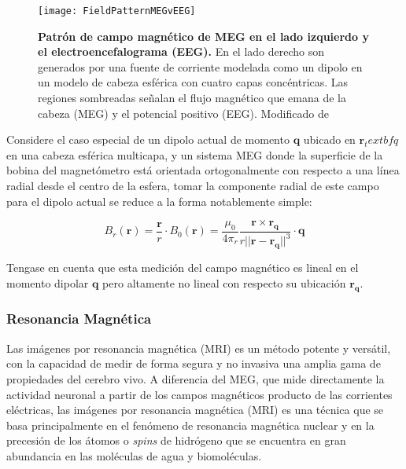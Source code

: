 \documentclass[11pt,letterpaper]{article}
\numberwithin{equation}{subsection}
\numberwithin{table}{subsection}
\begin{document}
\begin{figure}[H]
\centering
	\texttt{[image: FieldPatternMEGvEEG]}
	\captionsetup{labelfont=bf}
	\caption{\scriptsize \textbf{Patrón de campo magnético de MEG en el lado izquierdo y el electroencefalograma (EEG).} En el lado derecho son generados por una fuente de corriente modelada como un dipolo en un modelo de cabeza esférica con cuatro capas concéntricas. Las regiones sombreadas señalan el flujo magnético que emana de la cabeza (MEG) y el potencial positivo (EEG). Modificado de \cite{niedermeyer2005electroencephalography}} 
	\label{fig:Fig4}
\end{figure}

\bigskip
\noindent  Considere el caso especial de un dipolo actual de momento $\textbf{q}$ ubicado en $\textbf{r}_textbf{q}$ en una cabeza esférica multicapa, y un sistema MEG donde la superficie de la bobina del magnetómetro está orientada ortogonalmente con respecto a una línea radial desde el centro de la esfera, tomar la componente radial de este campo para el dipolo actual se reduce a la forma notablemente simple: 

\begin{equation}
B_r(\textbf{r}) = \frac{\textbf{r}}{r}\cdot B_0(\textbf{r})=\frac{\mu_0}{4\pi_r} \frac{\textbf{r} \times \textbf{r}_\textbf{q}}{r||\textbf{r} - \textbf{r}_\textbf{q}||^3} \cdot \textbf{q} 
\end{equation}

\smallskip
\noindent Tengase en cuenta que esta medición del campo magnético es lineal en el momento dipolar $\textbf{q}$ pero altamente no lineal con respecto su ubicación $\textbf{r}_\textbf{q}$. 

\bigskip
\noindent 

\subsubsection{Resonancia Magnética}

\smallskip
\noindent Las imágenes por resonancia magnética (MRI) es un método potente y versátil, con la capacidad de medir de forma segura y no invasiva una amplia gama de propiedades del cerebro vivo. A diferencia del MEG, que mide directamente la actividad neuronal a partir de los campos magnéticos producto de las corrientes eléctricas, las imágenes por resonancia magnética (MRI) es una técnica que se basa principalmente en el fenómeno de resonancia magnética nuclear y en la precesión  de los  átomos  o \textit{spins} de hidrógeno que se encuentra en gran abundancia en las moléculas de agua y biomoléculas. %
\end{document}
